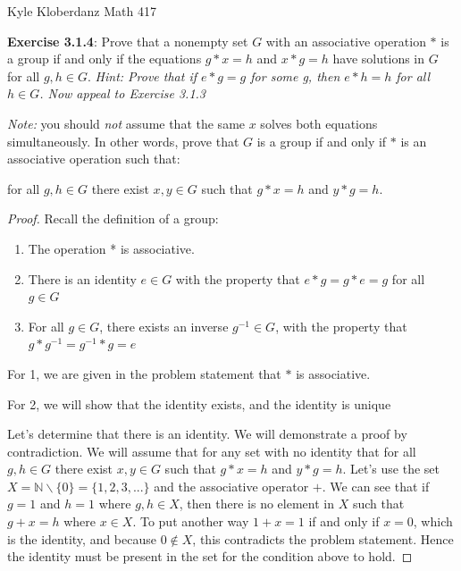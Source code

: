 \documentclass[a4paper]{article}
\begin{document}
\begin{myparindent}{0pt}

Kyle Kloberdanz \newline
Math 417

\textbf{Exercise 3.1.4}:
Prove that a nonempty set $G$ with an associative operation $*$ is a group if
and only if the equations $g * x = h$ and $x * g = h$ have solutions in $G$
for all $g, h \in G$. \textit{Hint: Prove that if $e * g = g$ for some g, then
$e * h = h$ for all $h \in G$. Now appeal to Exercise 3.1.3} \newline

\textit{Note:} you should \textit{not} assume that the same $x$ solves both
equations simultaneously. In other words, prove that $G$ is a group if and only
if $*$ is an associative operation such that: \newline

for all $g, h \in G$ there exist $x, y \in G$ such that $g * x = h$ and $y * g = h$.
\newline

\begin{proof}
  Recall the definition of a group:
  \begin{enumerate}
    \item The operation * is associative.
    \item There is an identity $e \in G$ with the property that $e * g = g * e = g$
    for all $g \in G$
    \item For all $g \in G$, there exists an inverse $g^{-1} \in G$, with the
    property that $g * g^{-1} = g^{-1} * g = e$
  \end{enumerate}

  For 1, we are given in the problem statement that $*$ is associative. \newline

  For 2, we will show that the identity exists, and the identity is unique \newline

  Let's determine that there is an identity. We will demonstrate a proof by contradiction.
  We will assume that for any set with no identity that for all
  $g, h \in G$ there exist $x, y \in G$ such that $g * x = h$ and $y * g = h$.
  Let's use the set $X = \mathbb{N} \backslash \{0\} = \{1, 2, 3, ...\}$ and the
  associative operator $+$.
  We can see that if $g = 1$ and $h = 1$ where $g, h \in X$, then there is no
  element in $X$ such that $g + x = h$ where $x \in X$. To put another way
  $1 + x = 1$ if and only if $x = 0$, which is the identity, and because $0 \notin X$,
  this contradicts the problem statement. Hence the identity
  must be present in the set for the condition above to hold. \newline


\end{proof}
\end{myparindent}
\end{document}
